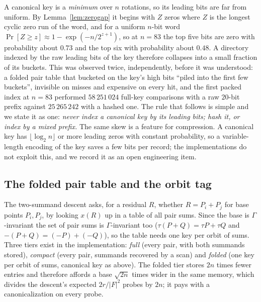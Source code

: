A canonical key is a \emph{minimum} over $n$ rotations, so its leading
bits are far from uniform. By Lemma~\ref{lem:zerogap} it begins with
$Z$ zeros where $Z$ is the longest cyclic zero run of the word, and for
a uniform $n$-bit word $\Pr[Z\ge z]\approx1-\exp(-n/2^{z+1})$, so at
$n=83$ the top five bits are zero with probability about $0.73$ and
the top six with probability about $0.48$. A directory indexed by the
raw leading bits of the key therefore collapses into a small fraction
of its buckets. This was observed twice, independently, before it was
understood: a folded pair table that bucketed on the key's high bits
``piled into the first few buckets'', invisible on misses and
expensive on every hit, and the first packed index at $n=83$ performed
$58\,251\,024$ full-key comparisons with a raw $20$-bit prefix against
$25\,265\,242$ with a hashed one.
The rule that follows is simple and we state it as one: \emph{never
index a canonical key by its leading bits; hash it, or index by a
mixed prefix.} The same skew is a feature for compression. A canonical
key has $\lfloor\log_2 n\rfloor$ or more leading zeros with constant
probability, so a variable-length encoding of the key saves a few
bits per record; the implementations do not exploit this, and we
record it as an open engineering item.

\subsection{The folded pair table and the orbit tag}
\label{sec:pairtable}

The two-summand descent asks, for a residual $R$, whether
$R=P_i+P_j$ for base points $P_i,P_j$, by looking $x(R)$ up in a table
of all pair sums. Since the base is $\Gamma$-invariant the set of pair
sums is $\Gamma$-invariant too ($\tau(P+Q)=\tau P+\tau Q$ and
$-(P+Q)=(-P)+(-Q)$), so the table needs one key per orbit of sums.
Three tiers exist in the implementation: \emph{full} (every pair, with
both summands stored), \emph{compact} (every pair, summands
recovered by a scan) and \emph{folded} (one key per orbit of sums,
canonical key as above). The folded tier stores $2n$ times fewer
entries and therefore affords a base $\sqrt{2n}$ times wider in the
same memory, which divides the descent's expected $2r/|F|^2$ probes
by $2n$; it pays with a canonicalization on every probe.

